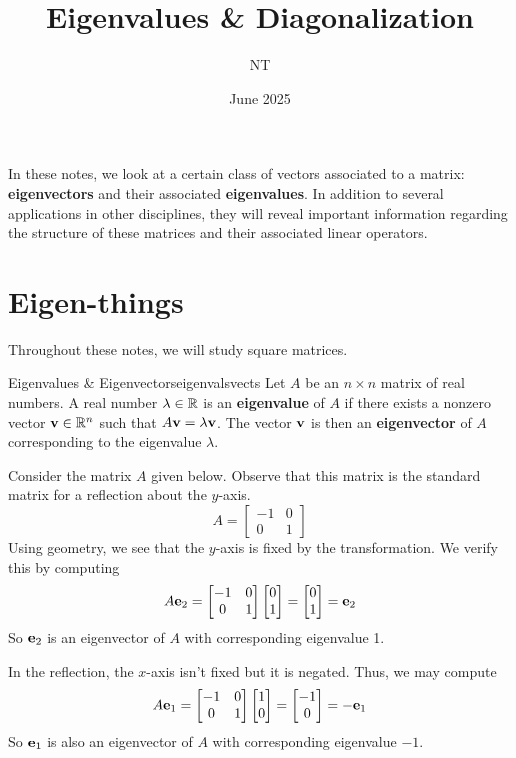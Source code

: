 \documentclass[mathshortcuts, colorful]{notes}
\title{Eigenvalues \& Diagonalization}
\author{NT}
\date{June 2025}
\begin{document}
    \maketitle
    
    In these notes, we look at a certain class of vectors associated to a matrix: \textbf{eigenvectors} and their associated \textbf{eigenvalues}. In addition to several applications in other disciplines, they will reveal important information regarding the structure of these matrices and their associated linear operators. 

    \section{Eigen-things}
    Throughout these notes, we will study square matrices. 
    \begin{cdefn}{Eigenvalues \& Eigenvectors}{eigenvalsvects}
        Let $A$ be an $n \times n$ matrix of real numbers. A real number $\lambda \in \mathbb{R}$ is an \textbf{eigenvalue} of $A$ if there exists a nonzero vector $\mathbf{v}\in \mathbb{R}^n$ such that $A \mathbf{v} = \lambda \mathbf{v}$. The vector $\mathbf{v}$ is then an \textbf{eigenvector} of $A$ corresponding to the eigenvalue $\lambda$.
    \end{cdefn}

    \begin{example}
        Consider the matrix $A$ given below. Observe that this matrix is the standard matrix for a reflection about the $y$-axis. 
        \begin{equation*}
            A = \begin{bmatrix}
                -1 & 0 \\ 
                0 & 1
            \end{bmatrix}
        \end{equation*}
        Using geometry, we see that the $y$-axis is fixed by the transformation. We verify this by computing 
        \begin{equation*}
            A\mathbf{e}_2 = \begin{bmatrix}
                -1 & 0 \\ 
                0 & 1
            \end{bmatrix} \begin{bmatrix} 0 \\ 1 \end{bmatrix} = \begin{bmatrix} 0 \\ 1 \end{bmatrix} = \mathbf{e}_2 
        \end{equation*}
        So $\mathbf{e}_2$ is an eigenvector of $A$ with corresponding eigenvalue 1. 

        In the reflection, the $x$-axis isn't fixed but it is negated. Thus, we may compute 
        \begin{equation*}
            A\mathbf{e}_1 = \begin{bmatrix}
                -1 & 0 \\ 
                0 & 1
            \end{bmatrix} \begin{bmatrix} 1 \\ 0 \end{bmatrix} = \begin{bmatrix} -1 \\ 0 \end{bmatrix} = -\mathbf{e}_1
        \end{equation*}
        So $\mathbf{e}_1$ is also an eigenvector of $A$ with corresponding eigenvalue $-1$.
    \end{example}
\end{document}
